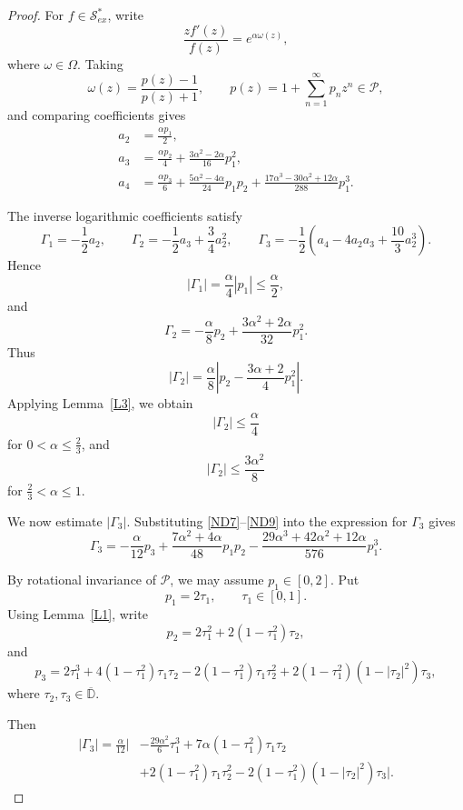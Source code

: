 \documentclass[11pt,reqno]{amsart}
\numberwithin{equation}{section}
\begin{document}
\begin{proof}
For $f\in\mathcal{S}_{ex}^{\ast}$, write
\[
\frac{zf'(z)}{f(z)}=e^{\alpha\omega(z)},
\]
where $\omega\in\Omega$. Taking
\[
\omega(z)=\frac{p(z)-1}{p(z)+1},
\qquad
p(z)=1+\sum_{n=1}^{\infty} p_n z^n\in\mathcal{P},
\]
and comparing coefficients gives
\begin{align}
a_2&=\frac{\alpha p_1}{2},\label{ND7}\\
a_3&=\frac{\alpha p_2}{4}
+\frac{3\alpha^2-2\alpha}{16}p_1^2,\label{ND8}\\
a_4&=\frac{\alpha p_3}{6}
+\frac{5\alpha^2-4\alpha}{24}p_1p_2
+\frac{17\alpha^3-30\alpha^2+12\alpha}{288}p_1^3.\label{ND9}
\end{align}

The inverse logarithmic coefficients satisfy
\[
\Gamma_1=-\frac12 a_2,\qquad
\Gamma_2=-\frac12 a_3+\frac34 a_2^2,\qquad
\Gamma_3=-\frac12\left(a_4-4a_2a_3+\frac{10}{3}a_2^3\right).
\]
Hence
\[
|\Gamma_1|=\frac{\alpha}{4}|p_1|\le \frac{\alpha}{2},
\]
and
\[
\Gamma_2
=-\frac{\alpha}{8}p_2
+\frac{3\alpha^2+2\alpha}{32}p_1^2.
\]
Thus
\[
|\Gamma_2|
=\frac{\alpha}{8}
\left|p_2-\frac{3\alpha+2}{4}p_1^2\right|.
\]
Applying Lemma~\ref{L3}, we obtain
\[
|\Gamma_2|\le \frac{\alpha}{4}
\]
for $0<\alpha\le \frac23$, and
\[
|\Gamma_2|\le \frac{3\alpha^2}{8}
\]
for $\frac23<\alpha\le 1$.

We now estimate $|\Gamma_3|$. Substituting \eqref{ND7}--\eqref{ND9} into the expression for $\Gamma_3$ gives
\begin{equation}\label{ND11}
\Gamma_3
=
-\frac{\alpha}{12}p_3
+\frac{7\alpha^2+4\alpha}{48}p_1p_2
-\frac{29\alpha^3+42\alpha^2+12\alpha}{576}p_1^3.
\end{equation}

By rotational invariance of $\mathcal{P}$, we may assume $p_1\in[0,2]$. Put
\[
p_1=2\tau_1,\qquad \tau_1\in[0,1].
\]
Using Lemma~\ref{L1}, write
\[
p_2=2\tau_1^2+2(1-\tau_1^2)\tau_2,
\]
and
\[
p_3
=
2\tau_1^3
+4(1-\tau_1^2)\tau_1\tau_2
-2(1-\tau_1^2)\tau_1\tau_2^2
+2(1-\tau_1^2)(1-|\tau_2|^2)\tau_3,
\]
where $\tau_2,\tau_3\in\overline{\mathbb{D}}$.

Then
\begin{equation}\label{ND12}
\begin{aligned}
|\Gamma_3|
=
\frac{\alpha}{12}\Bigg|
&-\frac{29\alpha^2}{6}\tau_1^3
+7\alpha(1-\tau_1^2)\tau_1\tau_2\\
&+2(1-\tau_1^2)\tau_1\tau_2^2
-2(1-\tau_1^2)(1-|\tau_2|^2)\tau_3
\Bigg|.
\end{aligned}
\end{equation}


\end{proof}
\end{document}
